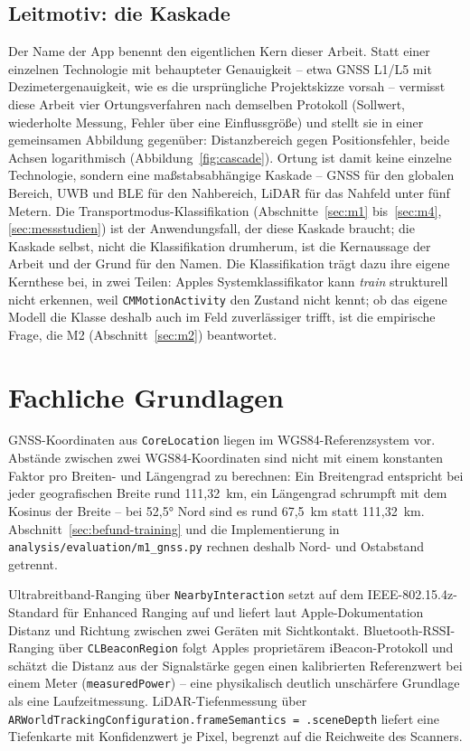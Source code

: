 \documentclass[11pt,a4paper,oneside]{article}
\begin{document}
\subsection{Leitmotiv: die Kaskade}
\label{sec:leitmotiv}

Der Name der App benennt den eigentlichen Kern dieser Arbeit. Statt einer
einzelnen Technologie mit behaupteter Genauigkeit -- etwa GNSS L1/L5 mit
Dezimetergenauigkeit, wie es die ursprüngliche Projektskizze vorsah --
vermisst diese Arbeit vier Ortungsverfahren nach demselben Protokoll
(Sollwert, wiederholte Messung, Fehler über eine Einflussgröße) und stellt
sie in einer gemeinsamen Abbildung gegenüber: Distanzbereich gegen
Positionsfehler, beide Achsen logarithmisch
(Abbildung~\ref{fig:cascade}). Ortung ist damit keine einzelne Technologie,
sondern eine maßstabsabhängige Kaskade -- GNSS für den globalen Bereich,
UWB und BLE für den Nahbereich, LiDAR für das Nahfeld unter fünf Metern.
Die Transportmodus-Klassifikation (Abschnitte~\ref{sec:m1}
bis~\ref{sec:m4}, \ref{sec:messstudien}) ist der Anwendungsfall, der diese
Kaskade braucht; die Kaskade selbst, nicht die Klassifikation drumherum, ist
die Kernaussage der Arbeit und der Grund für den Namen. Die Klassifikation
trägt dazu ihre eigene Kernthese bei, in zwei Teilen: Apples
Systemklassifikator kann \emph{train} strukturell nicht erkennen, weil
\texttt{CMMotionActivity} den Zustand nicht kennt; ob das eigene Modell die
Klasse deshalb auch im Feld zuverlässiger trifft, ist die empirische Frage,
die M2 (Abschnitt~\ref{sec:m2}) beantwortet.

\section{Fachliche Grundlagen}

GNSS-Koordinaten aus \texttt{CoreLocation} liegen im WGS84-Referenzsystem
vor. Abstände zwischen zwei WGS84-Koordinaten sind nicht mit einem
konstanten Faktor pro Breiten- und Längengrad zu berechnen: Ein Breitengrad
entspricht bei jeder geografischen Breite rund 111{,}32~km, ein Längengrad
schrumpft mit dem Kosinus der Breite -- bei 52{,}5° Nord sind es rund
67{,}5~km statt 111{,}32~km. Abschnitt~\ref{sec:befund-training} und die
Implementierung in \texttt{analysis/evaluation/m1\_gnss.py} rechnen deshalb
Nord- und Ostabstand getrennt.

Ultrabreitband-Ranging über \texttt{NearbyInteraction} setzt auf dem
IEEE-802.15.4z-Standard für Enhanced Ranging auf und liefert laut
Apple-Dokumentation Distanz und Richtung zwischen zwei Geräten mit
Sichtkontakt. Bluetooth-RSSI-Ranging über \texttt{CLBeaconRegion} folgt
Apples proprietärem iBeacon-Protokoll und schätzt die Distanz aus der
Signalstärke gegen einen kalibrierten Referenzwert bei einem Meter
(\texttt{measuredPower}) -- eine physikalisch deutlich unschärfere Grundlage
als eine Laufzeitmessung. LiDAR-Tiefenmessung über
\texttt{ARWorldTrackingConfiguration.frameSemantics = .sceneDepth} liefert
eine Tiefenkarte mit Konfidenzwert je Pixel, begrenzt auf die Reichweite des
Scanners.
\end{document}
